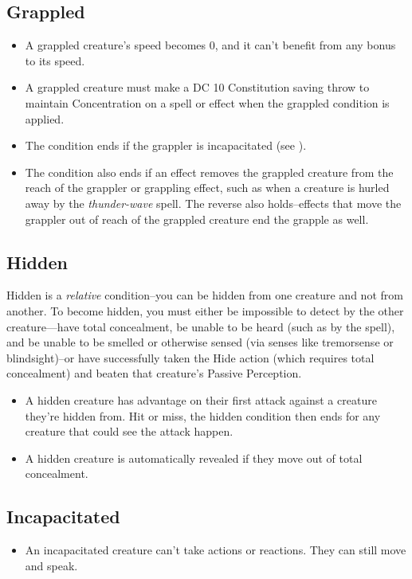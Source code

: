 \subsection{Grappled\label{condition:grappled}}
\begin{itemize}
\item A grappled creature's speed becomes 0, and it can't benefit from any bonus to its speed.
\item A grappled creature must make a DC 10 Constitution saving throw to maintain Concentration on a spell or effect when the grappled condition is applied.
\item The condition ends if the grappler is incapacitated (see ).
\item The condition also ends if an effect removes the grappled creature from the reach of the grappler or grappling effect, such as when a creature is hurled away by the \textit{thunder-wave} spell. The reverse also holds--effects that move the grappler out of reach of the grappled creature end the grapple as well.
\end{itemize}

\subsection{Hidden}\label{condition:hidden}
Hidden is a \textit{relative} condition--you can be hidden from one creature and not from another. To become hidden, you must either be impossible to detect by the other creature---have total concealment, be unable to be heard (such as by the  spell), and be unable to be smelled or otherwise sensed (via senses like tremorsense or blindsight)--or have successfully taken the Hide action (which requires total concealment) and beaten that creature's Passive Perception.
\begin{itemize}
	\item A hidden creature has advantage on their first attack against a creature they're hidden from. Hit or miss, the hidden condition then ends for any creature that could see the attack happen.
	\item A hidden creature is automatically revealed if they move out of total concealment.
\end{itemize}

\subsection{Incapacitated\label{condition:incapacitated}}
\begin{itemize}
\item An incapacitated creature can't take actions or reactions. They can still move and speak.
\end{itemize}

